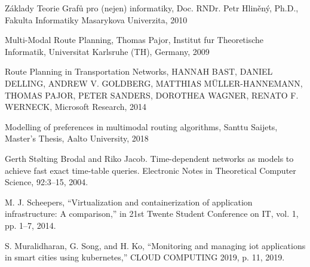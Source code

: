 \documentclass[thesis=M,czech]{FITthesis}[2019/12/23]
\theoremstyle{plain}
\theoremstyle{definition}
\begin{document}


\begin{thebibliography}{9}

	



Základy Teorie Grafů pro (nejen) informatiky, Doc. RNDr. Petr Hliněný, Ph.D., Fakulta Informatiky Masarykova Univerzita, 2010


Multi-Modal Route Planning, Thomas Pajor, Institut fur Theoretische Informatik, Universitat Karlsruhe (TH), Germany, 2009

Route Planning in Transportation Networks, HANNAH BAST, DANIEL DELLING, ANDREW V. GOLDBERG, MATTHIAS MÜLLER-HANNEMANN, THOMAS PAJOR, PETER SANDERS, DOROTHEA WAGNER, RENATO F. WERNECK, Microsoft Research, 2014


Modelling of preferences in multimodal routing algorithms, Santtu Saijets, Master’s Thesis, Aalto University, 2018


Gerth Stølting Brodal and Riko Jacob. Time-dependent networks as models to achieve fast exact time-table queries. Electronic Notes in Theoretical Computer Science, 92:3–15, 2004.



M. J. Scheepers, “Virtualization and containerization of application infrastructure: A comparison,” in 21st Twente Student Conference on IT, vol. 1,
pp. 1–7, 2014.


S. Muralidharan, G. Song, and H. Ko, “Monitoring and managing iot applications in smart cities using kubernetes,” CLOUD COMPUTING 2019,
p. 11, 2019.



\end{thebibliography}
\end{document}
